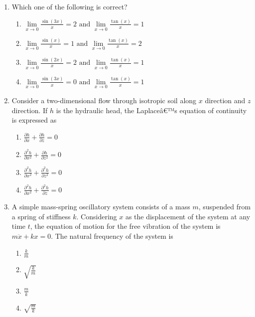 \documentclass[12pt]{article}
\begin{document}
\begin{enumerate}[label=Q.\arabic*]
	\item Which one of the following is correct?
		\begin{enumerate}[label=(\Alph*)]
			\item $\lim\limits_{x \to 0} \frac{\sin(3x)}{x} = 2 \text{ and } \lim\limits_{x \to 0} \frac{\tan(x)}{x} = 1$ \\
			\item $\lim\limits_{x \to 0} \frac{\sin(x)}{x} = 1 \text{ and } \lim\limits_{x \to 0} \frac{\tan(x)}{x} = 2$ \\
			\item $\lim\limits_{x \to 0} \frac{\sin(2x)}{x} = 2 \text{ and } \lim\limits_{x \to 0} \frac{\tan(x)}{x} = 1$ \\
			\item $\lim\limits_{x \to 0} \frac{\sin(3x)}{x} = 0 \text{ and } \lim\limits_{x \to 0} \frac{\tan(x)}{x} = 1$
		\end{enumerate}

	\item Consider a two-dimensional flow through isotropic soil along $x$ direction and $z$ direction. If $h$ is the hydraulic head, the Laplaceâ€™s equation of continuity is expressed as
		\begin{multicols}{2}
			\begin{enumerate}[label=(\Alph*)]
				\item $\frac{\partial h}{\partial x} + \frac{\partial h}{\partial z} = 0$ \\
				\item $\frac{\partial^2 h}{\partial x^2} + \frac{\partial h}{\partial z^2} = 0$ \\
				\item $\frac{\partial^2 h}{\partial x^2} + \frac{\partial^2 h}{\partial z^2} = 0$ \\
				\item $\frac{\partial^2 h}{\partial x^2} + \frac{\partial^2 h}{\partial z} = 0$
			\end{enumerate}
		\end{multicols}

	\item A simple mass-spring oscillatory system consists of a mass $m$, suspended from a spring of stiffness $k$. Considering $x$ as the displacement of the system at any time $t$, the equation of motion for the free vibration of the system is $m\ddot{x} + kx = 0$. The natural frequency of the system is
		\begin{multicols}{4}
			\begin{enumerate}[label=(\Alph*)]
				\item $\frac{k}{m}$ 
				\item $\sqrt{\frac{k}{m}}$ 
				\item $\frac{m}{k}$ 
				\item $\sqrt{\frac{m}{k}}$
			\end{enumerate}
		\end{multicols}


\end{enumerate}
\end{document}
